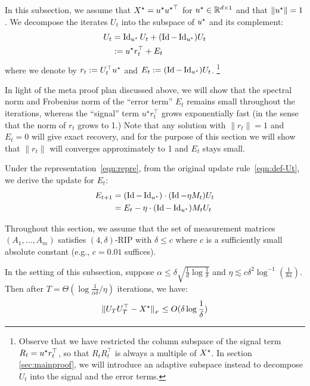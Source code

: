 In this subsection, we assume that ${X}^\star = {u^{\star}} {u^{\star}}^{\top}$ for ${u^{\star}} \in \mathbb{R}^{d\times 1}$ and that $\|{u^{\star}}\| = 1$. 
We decompose the iterates $U_t$ into the subspace of ${u^{\star}}$ and its complement:
\begin{align}
	U_t & = \operatorname{Id}_{{u^{\star}}}U_t +  (\operatorname{Id} - \operatorname{Id}_{{u^{\star}}}) U_t\nonumber \\
	 & := {u^{\star}} r_t^{\top} + E_t\label{eqn:repre}
\end{align}
where we denote by $r_t:= U_t^{\top} {u^{\star}}$ and  $E_t := (\operatorname{Id} - \operatorname{Id}_{{u^{\star}}}) U_t$.
\footnote{Observe that we have restricted the column subspace of the signal term $R_t = {u^{\star}} r_t^{\top}$, so that $R_tR_t^{\top}$ is always a multiple of ${X}^\star$.
In section \ref{sec:mainproof}, we will introduce an adaptive subspace instead to decompose $U_t$ into the signal and the error terms.}

In light of the meta proof plan discussed above,  we will show that the spectral norm and Frobenius norm of the ``error term'' $E_t$ remains small throughout the iterations, whereas the ``signal'' term $u^\star r_t^\top$ grows exponentially fast (in the sense that the norm of $r_t$ grows to 1.) Note that any solution with $\|r_t\|=1$ and $E_t =0$ will give exact recovery, and for the purpose of this section we will show that $\|r_t\|$ will converges approximately to 1 and $E_t$ stays small. 






Under the representation~\eqref{eqn:repre}, from the original update rule~\eqref{eqn:def-Ut}, we derive the update for $E_t$:
	\begin{align}
E_{t+1} &= (\operatorname{Id} - \operatorname{Id}_{{u^{\star}}}) \cdot (\operatorname{Id} - \eta M_t) U_t \nonumber\\&= E_t - \eta \cdot (\operatorname{Id} - \operatorname{Id}_{{u^{\star}}}) M_t U_t \label{eqn:update-et}
\end{align}

Throughout this section, we assume that the set of measurement matrices $(A_1,\dots, A_m)$ satisfies $(4,\delta)$-RIP with $\delta \le c$ where $c$ is a sufficiently small absolute constant (e.g., $c=0.01$ suffices). 
\begin{thm}\label{thm:rank1} In the setting of this subsection, suppose $\alpha \le \delta \sqrt{ \frac {1} d \log{\frac 1 {\delta}}}$ and $\eta \lesssim  c\delta^2\log^{-1} (\frac 1 {\delta \alpha})$.
			Then after $T = \Theta(\log{\frac 1 {\alpha \delta}} / \eta)$ iterations, we have:
	\[ \|U_{T} U_{T}^{\top} - {X}^\star\|_{_{F}} \le O(\delta\log{\frac 1 {\delta}}) \]
\end{thm}

